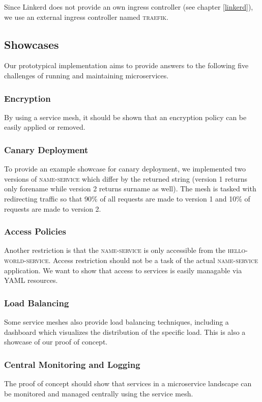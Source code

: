 Since Linkerd does not provide an own ingress controller (see chapter \ref{linkerd}), we use an external ingress controller named \textsc{traefik}.

\subsection{Showcases}
\label{sec:showcases-1}

Our prototypical implementation aims to provide answers to the following five challenges of running and maintaining microservices.

\subsubsection{Encryption}

By using a service mesh, it should be shown that an encryption policy can be easily applied or removed.

\subsubsection{Canary Deployment}

To provide an example showcase for canary deployment, we implemented two versions of \textsc{name-service} which differ by the returned string (version 1 returns only forename while version 2 returns surname as well).
The mesh is tasked with redirecting traffic so that 90\% of all requests are made to version 1 and 10\% of requests are made to version 2.

\subsubsection{Access Policies}

Another restriction is that the \textsc{name-service} is only accessible from the \textsc{hello-world-service}. Access restriction should not be a task of the actual \textsc{name-service} application. We want to show that access to services is easily managable via YAML resources.


\subsubsection{Load Balancing}
Some service meshes also provide load balancing techniques, including a dashboard which visualizes the distribution of the specific load. This is also a showcase of our proof of concept.

\subsubsection{Central Monitoring and Logging}
The proof of concept should show that services in a microservice landscape can be monitored and managed centrally using the service mesh.

